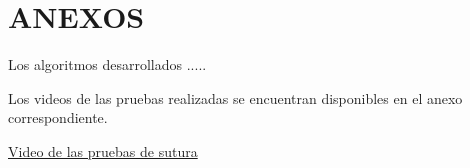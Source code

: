\chapter*{\center \Large ANEXOS}
\label{anexo:video_sutura}

\par Los algoritmos desarrollados .....

\par Los videos de las pruebas realizadas se encuentran disponibles en el anexo correspondiente.



\href{https://www.youtube.com/}{Video de las pruebas de sutura}
    
